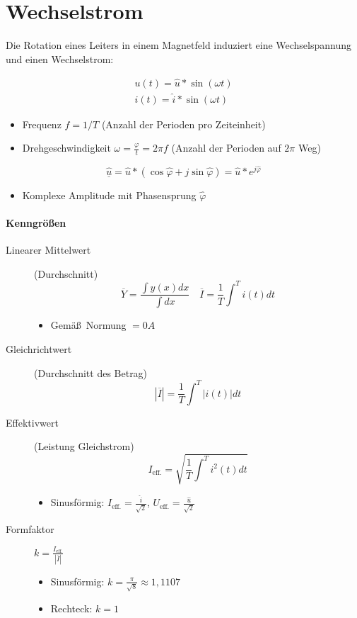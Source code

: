 \section{Wechselstrom}

Die Rotation eines Leiters in einem Magnetfeld induziert eine Wechselspannung und einen Wechselstrom:

\begin{gather*}
  u(t) = \hat{u} * \sin(\omega t) \\
  i(t) = \hat{i} * \sin(\omega t)
\end{gather*}

\begin{itemize}
  \item Frequenz $f = 1/T$ (Anzahl der Perioden pro Zeiteinheit)
  \item Drehgeschwindigkeit $\omega = \frac{\varphi}{t} = 2 \pi f$ (Anzahl der Perioden auf $2\pi$ Weg)
\end{itemize}

$$\underline{\hat{u}} = \hat{u} * (\cos \hat{\varphi} + j \sin \hat{\varphi}) = \hat{u} * e^{j\hat{\varphi}}$$

\begin{itemize}
  \item Komplexe Amplitude mit Phasensprung $\hat{\varphi}$
\end{itemize}

\paragraph{Kenngrö\ss en}

\begin{description}
  \item[Linearer Mittelwert] (Durchschnitt)
    $$\overline{Y} = \frac{\int y(x)dx}{\int dx} \quad \overline{I} = \frac{1}{T} \int^T i(t) dt$$

    \begin{itemize}
      \item Gemä\ss~Normung $= 0A$
    \end{itemize}

  \item[Gleichrichtwert] (Durchschnitt des Betrag)
    $$|\overline{I}| = \frac{1}{T} \int^T |i(t)| dt$$

  \item[Effektivwert] (Leistung Gleichstrom)
    $$I_\text{eff.} = \sqrt{\frac{1}{T} \int^T i^2(t) dt} $$

    \begin{itemize}
      \item Sinusförmig: $I_\text{eff.} = \frac{\hat{i}}{\sqrt{2}}$, $U_\text{eff.} = \frac{\hat{u}}{\sqrt{2}}$
    \end{itemize}

  \item[Formfaktor] $k = \frac{I_\text{eff.}}{|\overline{I}|}$

    \begin{itemize}
      \item Sinusförmig: $k = \frac{\pi}{\sqrt{8}} \approx 1,1107$
      \item Rechteck: $k = 1$
    \end{itemize}
\end{description}

